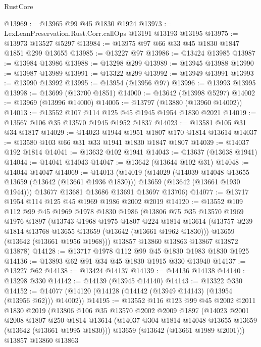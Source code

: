 \begin{lexlean}{RustCore}
\begin{coremodule}
@13969 := @13965 @99 @45 @1830 @1924
@13973 := LexLeanPreservation.Rust.Corr.callOps @13191 @13193 @13195
@13975 := @13973 @13527 @5297
@13984 := @13975 @97 @66 @33 @45 @1830 @1847 @1851 @299 @13655
@13985 := @13227 @97
@13986 := @13424 @13985
@13987 := @13984 @13986
@13988 := @13298 @299
@13989 := @13945 @13988
@13990 := @13987 @13989
@13991 := @13322 @299
@13992 := @13949 @13991
@13993 := @13990 @13992
@13995 := @13954 (@13956 @97)
@13996 := @13993 @13995
@13998 := @13699 (@13700 @1851)
@14000 := @13642 (@13998 @5297)
@14002 := @13969 (@13996 @14000)
@14005 := @13797 (@13880 (@13960 @14002))
@14013 := @13552 @107 @114 @125 @45 @1945 @1954 @1830 @2021
@14019 := @13567 @106 @35 @13570 @1945 @1952 @1837
@14023 := @13581 @105 @31 @34 @1817
@14029 := @14023 @1944 @1951 @1807 @170 @1814 @13614
@14037 := @13580 @103 @66 @31 @33 @1941 @1830 @1847 @1807
@14039 := @14037 @192 @1814
@14041 := @13632 @102 @1941
@14043 := @13637 (@13638 @1941)
@14044 := @14041 @14043
@14047 := @13642 (@13644 @102 @31)
@14048 := @14044 @14047
@14069 := @14013
    (@14019
      (@14029
        (@14039 @14048 @13655 @13659 (@13642 (@13661 @1936 @1830)))
        @13659
        (@13642 (@13661 @1930 @1944)))
      @13677
      @13681
      @13686
      @13691
      @13697
      @13706)
@14077 := @13717 @1954 @114 @125 @45 @1969 @1986 @2002 @2019
@14120 := @13552
    @109
    @112
    @99
    @45
    @1969
    @1978
    @1830
    @1986
    (@13806
      @75
      @35
      @13570
      @1969
      @1976
      @1897
      (@13743
        @1968
        @1975
        @1807
        @224
        @1814
        @13614
        (@13757 @239 @1814 @13768 @13655 @13659 (@13642 (@13661 @1962 @1830)))
        @13659
        (@13642 (@13661 @1956 @1968)))
      @13857
      @13860
      @13863
      @13867
      @13872
      @13878)
@14128 := @13717 @1978 @112 @99 @45 @1830 @1983 @1830 @1925
@14136 := @13893 @62 @91 @34 @45 @1830 @1915 @330 @13940
@14137 := @13227 @62
@14138 := @13424 @14137
@14139 := @14136 @14138
@14140 := @13298 @330
@14142 := @14139 (@13945 @14140)
@14143 := @13322 @330
@14152 := @14077 (@14120 (@14128 (@14142 (@13949 @14143) (@13954 (@13956 @62))) @14002))
@14195 := @13552
    @116
    @123
    @99
    @45
    @2002
    @2011
    @1830
    @2019
    (@13806
      @106
      @35
      @13570
      @2002
      @2009
      @1897
      (@14023
        @2001
        @2008
        @1807
        @250
        @1814
        @13614
        (@14037 @304 @1814 @14048 @13655 @13659 (@13642 (@13661 @1995 @1830)))
        @13659
        (@13642 (@13661 @1989 @2001)))
      @13857
      @13860
      @13863

\end{coremodule}
\end{lexlean}

